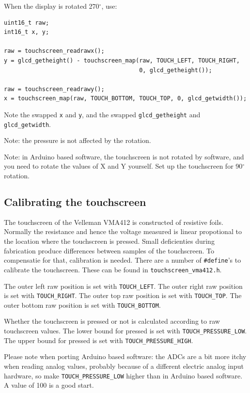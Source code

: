\documentclass[12pt]{article}
\begin{document}
When the display is rotated 270$^\circ$, use:

\begin{lstlisting}
uint16_t raw;
int16_t x, y;

raw = touchscreen_readrawx();
y = glcd_getheight() - touchscreen_map(raw, TOUCH_LEFT, TOUCH_RIGHT,
                                       0, glcd_getheight());

raw = touchscreen_readrawy();
x = touchscreen_map(raw, TOUCH_BOTTOM, TOUCH_TOP, 0, glcd_getwidth());
\end{lstlisting}

Note the swapped \lstinline|x| and \lstinline|y|, and the swapped \lstinline|glcd_getheight| and \lstinline|glcd_getwidth|.

Note: the pressure is not affected by the rotation.

Note: in Arduino based software, the touchscreen is not rotated by software, and you need to rotate the values of X and Y yourself. Set up the touchscreen for 90$^\circ$ rotation.

\subsection{Calibrating the touchscreen}
\label{sec:calibrating}
The touchscreen of the Velleman VMA412 is constructed of resistive foils. Normally the resistance and hence the voltage measured is linear propotional to the location where the touchscreen is pressed. Small deficienties during fabrication produce differences between samples of the touchscreen. To compensatie for that, calibration is needed. There are a number of \lstinline|#define|'s to calibrate the touchscreen. These can be found in \lstinline|touchscreen_vma412.h|.

The outer left raw position is set with \lstinline|TOUCH_LEFT|. The outer right raw position is set with \lstinline|TOUCH_RIGHT|. The outer top raw position is set with \lstinline|TOUCH_TOP|. The outer bottom raw position is set with \lstinline|TOUCH_BOTTOM|.

Whether the touchscreen is pressed or not is calculated according to raw touchscreen values. The lower bound for pressed is set with \lstinline|TOUCH_PRESSURE_LOW|. The upper bound for pressed is set with \lstinline|TOUCH_PRESSURE_HIGH|.

Please note when porting Arduino based software: the ADCs are a bit more itchy when reading analog values, probably because of a different electric analog input hardware, so make \lstinline|TOUCH_PRESSURE_LOW| higher than in Arduino based software. A value of 100 is a good start.
\end{document}
